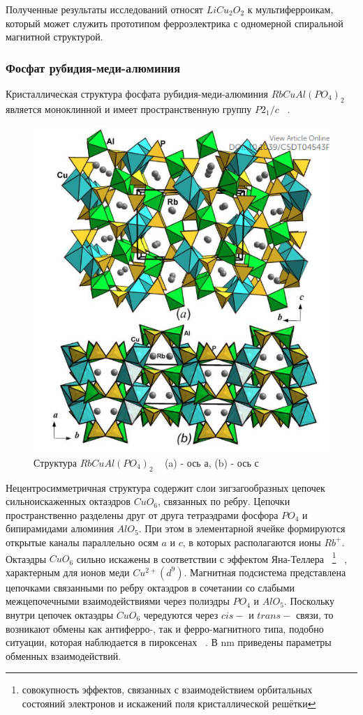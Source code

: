 \documentclass[11pt]{article}
\begin{document}
Полученные результаты исследований относят $LiCu_2O_2$ к мультиферроикам, который может служить прототипом ферроэлектрика с одномерной спиральной магнитной структурой.


\subsubsection{Фосфат рубидия-меди-алюминия}
Кристаллическая структура фосфата рубидия-меди-алюминия $RbCuAl(PO_4)_2$ является моноклинной и имеет пространственную группу $P2_1/c$ ~\cite{yakubovich2016}.

\begin{figure}[htp]
\centering
\includegraphics[scale=0.7]{RbCuAlPO42}
\caption {Структура $RbCuAl(PO_4)_2$ ~\cite{yakubovich2016} (a) - ось а, (b) - ось с}
\label{}
\end{figure}

Нецентросимметричная структура содержит слои зигзагообразных цепочек сильноискаженных октаэдров $CuO_6$, связанных по ребру. Цепочки пространственно разделены друг от друга тетраэдрами фосфора $PO_4$ и бипирамидами алюминия $AlO_5$. При этом в элементарной ячейке формируются открытые каналы параллельно осям $a$ и $c$, в которых располагаются ионы $Rb^{+}$. Октаэдры $CuO_6$ сильно искажены в соответствии с эффектом Яна-Теллера ~\footnote{совокупность эффектов, связанных с взаимодействием орбитальных состояний электронов и искажений поля кристаллической решётки} ~\cite{bersuker}, характерным для ионов меди $Cu^{2+}(d^9)$. Магнитная подсистема представлена цепочками связанными по ребру октаэдров в сочетании со слабыми межцепочечными взаимодействиями через полиэдры $PO_4$ и $AlO_5$. Поскольку внутри цепочек октаэдры $CuO_6$ чередуются через $cis-$ и $trans-$ связи, то возникают обмены как антиферро-, так и ферро-магнитного типа, подобно ситуации, которая наблюдается в пироксенах ~\cite{isobe2002}.
В {nm} приведены параметры обменных взаимодействий.
\end{document}
